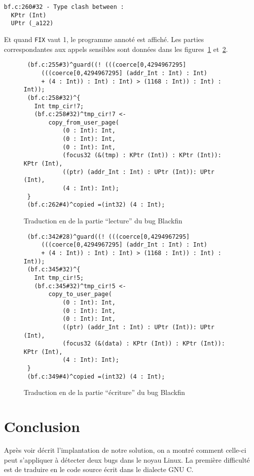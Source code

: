 \begin{Verbatim}
bf.c:260#32 - Type clash between :
  KPtr (Int)
  UPtr (_a122)
\end{Verbatim}

Et quand \texttt{FIX} vaut 1, le programme annoté est affiché. Les parties
correspondantes aux appels sensibles sont données dans les
figures~\ref{fig:black-npk1} et~\ref{fig:black-npk2}.

\begin{figure}[h]
\begin{Verbatim}
 (bf.c:255#3)^guard((! (((coerce[0,4294967295]
     (((coerce[0,4294967295] (addr_Int : Int) : Int)
     + (4 : Int)) : Int) : Int) > (1168 : Int)) : Int) : Int));
 (bf.c:258#32)^{
   Int tmp_cir!7;
   (bf.c:258#32)^tmp_cir!7 <-
       copy_from_user_page(
           (0 : Int): Int,
           (0 : Int): Int,
           (0 : Int): Int,
           (focus32 (&(tmp) : KPtr (Int)) : KPtr (Int)): KPtr (Int),
           ((ptr) (addr_Int : Int) : UPtr (Int)): UPtr (Int),
           (4 : Int): Int);
 }
 (bf.c:262#4)^copied =(int32) (4 : Int);
\end{Verbatim}
\caption{Traduction en \newspeak de la partie \enquote{lecture} du bug Blackfin}
\label{fig:black-npk1}
\end{figure}

\begin{figure}[h]
\begin{Verbatim}
 (bf.c:342#28)^guard((! (((coerce[0,4294967295]
     (((coerce[0,4294967295] (addr_Int : Int) : Int)
     + (4 : Int)) : Int) : Int) > (1168 : Int)) : Int) : Int));
 (bf.c:345#32)^{
   Int tmp_cir!5;
   (bf.c:345#32)^tmp_cir!5 <-
       copy_to_user_page(
           (0 : Int): Int,
           (0 : Int): Int,
           (0 : Int): Int,
           ((ptr) (addr_Int : Int) : UPtr (Int)): UPtr (Int),
           (focus32 (&(data) : KPtr (Int)) : KPtr (Int)): KPtr (Int),
           (4 : Int): Int);
 }
 (bf.c:349#4)^copied =(int32) (4 : Int);
\end{Verbatim}
\caption{Traduction en \newspeak de la partie \enquote{écriture} du bug Blackfin}
\label{fig:black-npk2}
\end{figure}

\section*{Conclusion}

Après voir décrit l'implantation de notre solution, on a montré comment celle-ci
peut s'appliquer à détecter deux bugs dans le noyau Linux. La première difficulté
est de traduire en \newspeak le code source écrit dans le dialecte GNU C.

